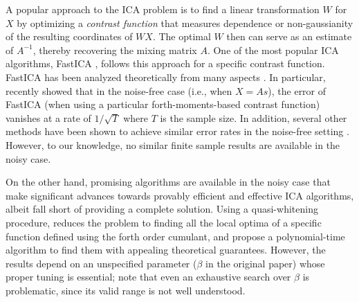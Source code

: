 \documentclass[11pt]{article}
\begin{document}
A popular approach to the ICA problem is to find a linear transformation $W$ for $X$ by optimizing a \emph{contrast function} 
that measures dependence or non-gaussianity of the resulting coordinates of $WX$.
The optimal $W$ then can serve as an estimate of $A^{-1}$, thereby recovering the mixing matrix $A$.
One of the most popular ICA algorithms, FastICA \citep{hyvarinen1999fast},
follows this approach for a specific contrast function.  
FastICA has been analyzed theoretically from many aspects \citep{tichavsky2006performance,oja2006fastica,ollila2010deflation,dermoune2013fastica,wei2014convergence,miettinen2014fourth}.
In particular, recently \citet{miettinen2014fourth} showed  that in the noise-free case (i.e., when $X = As$), the error of FastICA (when using a particular forth-moments-based contrast function) vanishes at a rate of $1/\sqrt{T}$ where $T$ is the sample size.
In addition, several other methods have been shown to achieve similar error rates in the noise-free setting \citep[e.g.,][]{eriksson2003characteristic,samarov2004nonparametric,chen2005consistent,chen2006efficient}.
However, to our knowledge, no similar finite sample results are available in the noisy case.

On the other hand, promising algorithms are available in the noisy case that make significant advances towards provably efficient and effective ICA algorithms, albeit fall short of providing a complete solution. 
Using a quasi-whitening procedure, \citet{arora2012provable} reduces the problem to finding all the local optima of a specific function defined using the forth order cumulant, 
and propose a polynomial-time algorithm to find them with appealing theoretical guarantees. However, the results depend on an unspecified parameter ($\beta$ in the original paper) whose proper tuning is essential; note that even an exhaustive search over $\beta$ is problematic, since its valid range is not well understood.
\end{document}
